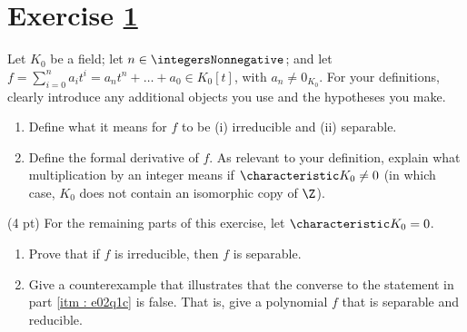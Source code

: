 %
%



\section{Exercise \ref{sec : e02q1}}
\label{sec : e02q1}

\noindent{}Let $K_{0}$ be a field; let $n \in \integersNonnegative$; and let $f = \sum_{i = 0}^{n} a_{i} t^{i} = a_{n} t^{n} + \ldots + a_{0} \in K_{0}[t]$, with $a_{n} \neq 0_{K_{0}}$. For your definitions, clearly introduce any additional objects you use and the hypotheses you make.
\begin{enumerate}[label=(\alph*)]
\item\label{itm : e02q1a} Define what it means for $f$ to be (i) irreducible and (ii) separable.
\item\label{itm : e02q1b} Define the formal derivative of $f$. As relevant to your definition, explain what multiplication by an integer means if $\characteristic K_{0} \neq 0$ (in which case, $K_{0}$ does not contain an isomorphic copy of $\Z$).
\end{enumerate}
(4 pt) For the remaining parts of this exercise, let $\characteristic K_{0} = 0$.
\begin{enumerate}[resume, label=(\alph*)]
\item\label{itm : e02q1c} Prove that if $f$ is irreducible, then $f$ is separable.
\item\label{itm : e02q1d} Give a counterexample that illustrates that the converse to the statement in part \ref{itm : e02q1c} is false. That is, give a polynomial $f$ that is separable and reducible.
\end{enumerate}

